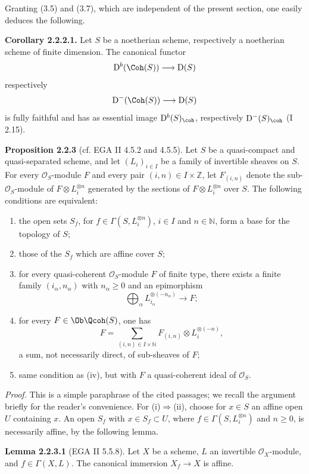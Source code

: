 \documentclass[11pt]{article}
\begin{document}
Granting (3.5) and (3.7), which are independent of the present section, one easily deduces the following.

\textbf{Corollary 2.2.2.1.} Let $S$ be a noetherian scheme, respectively a noetherian scheme of finite dimension. The canonical functor
\[
\mathrm D^b(\Coh(S))\longrightarrow \mathrm D(S)
\]
respectively
\[
\mathrm D^{-}(\Coh(S))\longrightarrow \mathrm D(S)
\]
is fully faithful and has as essential image $\mathrm D^b(S)_{\coh}$, respectively $\mathrm D^{-}(S)_{\coh}$ (I 2.15).

\textbf{Proposition 2.2.3} (cf. EGA II 4.5.2 and 4.5.5). Let $S$ be a quasi-compact and quasi-separated scheme, and let $(L_i)_{i\in I}$ be a family of invertible sheaves on $S$. For every $\mathcal O_S$-module $F$ and every pair $(i,n)\in I\times\mathbb Z$, let $F_{(i,n)}$ denote the sub-$\mathcal O_S$-module of $F\otimes L_i^{\otimes n}$ generated by the sections of $F\otimes L_i^{\otimes n}$ over $S$. The following conditions are equivalent:
\begin{enumerate}[label=(\roman*)]
\item the open sets $S_f$, for $f\in\Gamma(S,L_i^{\otimes n})$, $i\in I$ and $n\in\mathbb N$, form a base for the topology of $S$;
\item those of the $S_f$ which are affine cover $S$;
\item for every quasi-coherent $\mathcal O_S$-module $F$ of finite type, there exists a finite family $(i_\alpha,n_\alpha)$ with $n_\alpha\ge0$ and an epimorphism
\[
\bigoplus_\alpha L_{i_\alpha}^{\otimes(-n_\alpha)}\longrightarrow F;
\]
\item for every $F\in\Ob\Qcoh(S)$, one has
\[
F=\sum_{(i,n)\in I\times\mathbb N}F_{(i,n)}\otimes L_i^{\otimes(-n)},
\]
a sum, not necessarily direct, of sub-sheaves of $F$;
\item same condition as (iv), but with $F$ a quasi-coherent ideal of $\mathcal O_S$.
\end{enumerate}

\emph{Proof.} This is a simple paraphrase of the cited passages; we recall the argument briefly for the reader's convenience. For (i)$\Rightarrow$(ii), choose for $x\in S$ an affine open $U$ containing $x$. An open $S_f$ with $x\in S_f\subset U$, where $f\in\Gamma(S,L_i^{\otimes n})$ and $n\ge0$, is necessarily affine, by the following lemma.

\textbf{Lemma 2.2.3.1} (EGA II 5.5.8). Let $X$ be a scheme, $L$ an invertible $\mathcal O_X$-module, and $f\in\Gamma(X,L)$. The canonical immersion $X_f\to X$ is affine.
\end{document}
